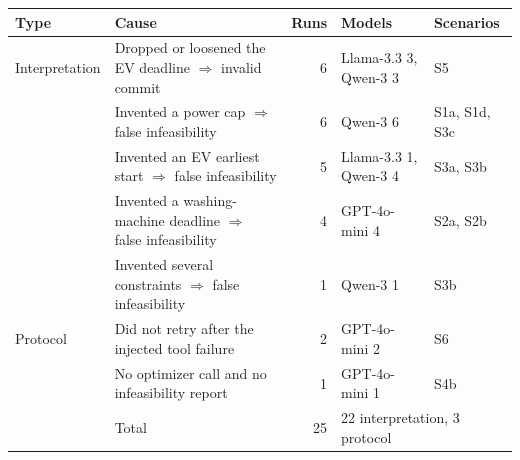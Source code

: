 \begin{tabular}{llrll}
\toprule
Type & Cause & Runs & Models & Scenarios \\
\midrule
Interpretation & Dropped or loosened the EV deadline $\Rightarrow$ invalid commit & 6 & Llama-3.3 3, Qwen-3 3 & S5 \\
 & Invented a power cap $\Rightarrow$ false infeasibility & 6 & Qwen-3 6 & S1a, S1d, S3c \\
 & Invented an EV earliest start $\Rightarrow$ false infeasibility & 5 & Llama-3.3 1, Qwen-3 4 & S3a, S3b \\
 & Invented a washing-machine deadline $\Rightarrow$ false infeasibility & 4 & GPT-4o-mini 4 & S2a, S2b \\
 & Invented several constraints $\Rightarrow$ false infeasibility & 1 & Qwen-3 1 & S3b \\
\midrule
Protocol & Did not retry after the injected tool failure & 2 & GPT-4o-mini 2 & S6 \\
 & No optimizer call and no infeasibility report & 1 & GPT-4o-mini 1 & S4b \\
\midrule
 & Total & 25 & \multicolumn{2}{l}{22 interpretation, 3 protocol} \\
\bottomrule
\end{tabular}
